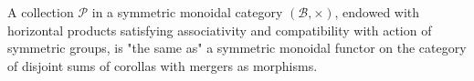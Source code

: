 A collection $\mathcal{P}$ in a symmetric monoidal category $(\mathcal{B}, \times)$, endowed with horizontal products satisfying associativity and compatibility with action of symmetric groups, is "the same as" a symmetric monoidal functor on the category of disjoint sums of corollas with mergers as morphisms.
